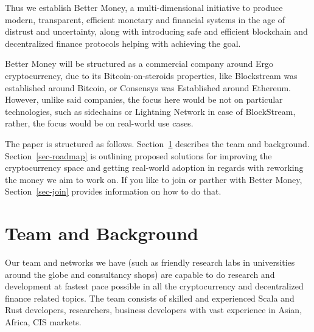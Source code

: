 \documentclass{llncs}   %
\begin{document}
Thus we establish Better Money, a multi-dimensional initiative to produce modern, transparent, efficient monetary and financial systems in the age of distrust and uncertainty, along with introducing safe and efficient blockchain and decentralized finance protocols helping with
achieving the goal.

Better Money will be structured as a commercial company around Ergo cryptocurrency, due to its Bitcoin-on-steroids properties,
like Blockstream was established around Bitcoin, or Consensys was Established around Ethereum. However, unlike said companies,
the focus here would be not on particular technologies, such as sidechains or Lightning Network in case of BlockStream, rather,
the focus would be on real-world use cases.

The paper is structured as follows. Section~\ref{sec-team} describes the team and background. Section~\ref{sec-roadmap} is
outlining proposed solutions for improving the cryptocurrency space and getting real-world adoption in regards with reworking the money
we aim to work on. If you like to join or parther with Better Money, Section~\ref{sec-join} provides information on
how to do that.

\section{Team and Background}
\label{sec-team}

Our team and networks we have (such as friendly research labs in universities around the globe and consultancy shops) are
capable to do research and development at fastest pace possible in all the cryptocurrency and decentralized finance related
topics. The team consists of skilled and experienced Scala and Rust developers, researchers, business developers with
vast experience in Asian, Africa, CIS markets.
\end{document}
